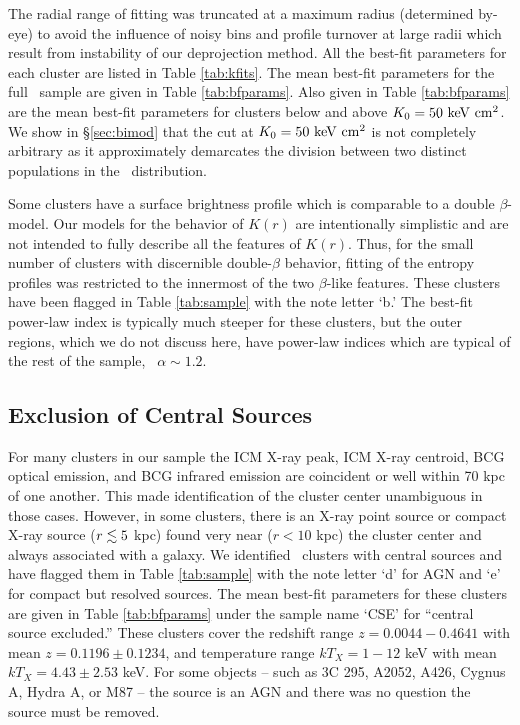 \documentclass[12pt,preprint]{aastex}
\begin{document}
The radial range of fitting was truncated at a maximum radius
(determined by-eye) to avoid the influence of noisy bins and profile
turnover at large radii which result from instability of our
deprojection method. All the best-fit parameters for each cluster are
listed in Table \ref{tab:kfits}. The mean best-fit parameters for the
full \accept\ sample are given in Table \ref{tab:bfparams}. Also given
in Table \ref{tab:bfparams} are the mean best-fit parameters for
clusters below and above $K_0 = 50 \mathrm{\mbox{\ensuremath{\mathrm{~keV}}} \mathrm{\mbox{\ensuremath{\mathrm{~cm}}}^2}}$. We show in
\S\ref{sec:bimod} that the cut at $K_0=50 \mathrm{\mbox{\ensuremath{\mathrm{~keV}}} \mathrm{\mbox{\ensuremath{\mathrm{~cm}}}^2}}$ is not completely
arbitrary as it approximately demarcates the division between two
distinct populations in the \kna\ distribution.

Some clusters have a surface brightness profile which is comparable to
a double $\beta$-model. Our models for the behavior of $K(r)$ are
intentionally simplistic and are not intended to fully describe all
the features of $K(r)$. Thus, for the small number of clusters with
discernible double-$\beta$ behavior, fitting of the entropy profiles
was restricted to the innermost of the two $\beta$-like
features. These clusters have been flagged in Table \ref{tab:sample}
with the note letter `b.' The best-fit power-law index is typically
much steeper for these clusters, but the outer regions, which we do
not discuss here, have power-law indices which are typical of the rest
of the sample, \ie\ $\alpha \sim 1.2$.


\subsection{Exclusion of Central Sources}
\label{sec:centsrc}

For many clusters in our sample the ICM X-ray peak, ICM X-ray
centroid, BCG optical emission, and BCG infrared emission are
coincident or well within 70 kpc of one another. This made
identification of the cluster center unambiguous in those
cases. However, in some clusters, there is an X-ray point source or
compact X-ray source ($r \lesssim 5$ kpc) found very near ($r < 10$ kpc)
the cluster center and always associated with a galaxy. We identified
\centsrcnum\ clusters with central sources and have flagged them in
Table \ref{tab:sample} with the note letter `d' for AGN and `e' for
compact but resolved sources. The mean best-fit parameters for these
clusters are given in Table \ref{tab:bfparams} under the sample name
`CSE' for ``central source excluded.'' These clusters cover the
redshift range $z = 0.0044-0.4641$ with mean $z = 0.1196 \pm 0.1234$,
and temperature range $kT_X = 1-12$ keV with mean $kT_X = 4.43 \pm
2.53$ keV. For some objects -- such as 3C 295, A2052, A426, Cygnus A,
Hydra A, or M87 -- the source is an AGN and there was no question the
source must be removed.
\end{document}
